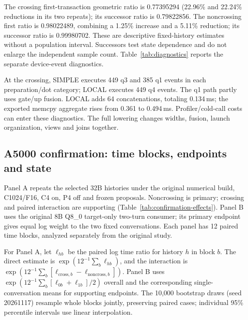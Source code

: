 
The crossing first-transaction geometric ratio is 0.77395294 (22.96\% and 22.24\% reductions in its two repeats); its successor ratio is 0.79822856. The noncrossing first ratio is 0.98022489, combining a 1.25\% increase and a 5.11\% reduction; its successor ratio is 0.99980702. These are descriptive fixed-history estimates without a population interval. Successors test state dependence and do not enlarge the independent sample count. Table~\ref{tab:diagnostics} reports the separate device-event diagnostics.


At the crossing, SIMPLE executes 449 q3 and 385 q1 events in each preparation/dot category; LOCAL executes 449 q4 events. The q1 path partly uses gate/up fusion. LOCAL adds 64 concatenations, totaling 0.134\,ms; the exported memcpy aggregate rises from 0.361 to 0.494\,ms. Profiler/cold-call costs can enter these diagnostics. The full lowering changes widths, fusion, launch organization, views and joins together.

\FloatBarrier
\subsection{A5000 confirmation: time blocks, endpoints and state}
\label{supp:confirmation}
Panel A repeats the selected 32B histories under the original numerical build, C1024/F16, C4 on, P4 off and frozen proposals. Noncrossing is primary; crossing and paired interaction are supporting (Table~\ref{tab:confirmation-effects}). Panel B uses the original 8B Q8\_0 target-only two-turn consumer; its primary endpoint gives equal log weight to the two fixed conversations. Each panel has 12 paired time blocks, analyzed separately from the original study.


For Panel A, let $\ell_{hb}$ be the paired log time ratio for history $h$ in block $b$. The direct estimate is $\exp(12^{-1}\sum_b\ell_{hb})$, and the interaction is $\exp(12^{-1}\sum_b[\ell_{\mathrm{cross},b}-\ell_{\mathrm{noncross},b}])$. Panel B uses $\exp(12^{-1}\sum_b[\ell_{0b}+\ell_{1b}]/2)$ overall and the corresponding single-conversation means for supporting endpoints. The 10,000 bootstrap draws (seed 20261117) resample whole blocks jointly, preserving paired cases; individual 95\% percentile intervals use linear interpolation.

